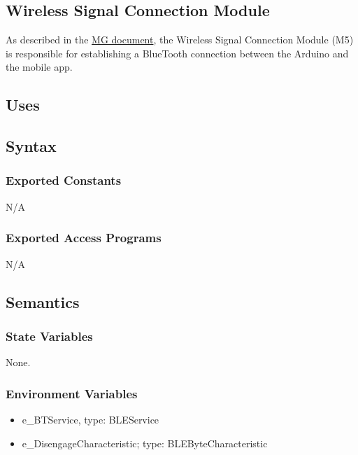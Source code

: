 \documentclass[12pt, titlepage]{article}
\begin{document}
\subsection{Wireless Signal Connection Module}

As described in the \href{https://github.com/NevoAbigail/Capstone/blob/main/docs/Design/SoftArchitecture/MG.pdf}{MG document}, the Wireless Signal Connection Module (M5) is responsible for establishing a BlueTooth connection between the Arduino and the mobile app.

\subsection{Uses}


\subsection{Syntax}

\subsubsection{Exported Constants}

N/A

\subsubsection{Exported Access Programs}

N/A

\subsection{Semantics}

\subsubsection{State Variables}

None.

\subsubsection{Environment Variables}

\begin{itemize}
\item e\_BTService, type: BLEService
\item e\_DisengageCharacteristic; type: BLEByteCharacteristic
\end{itemize}
\end{document}
